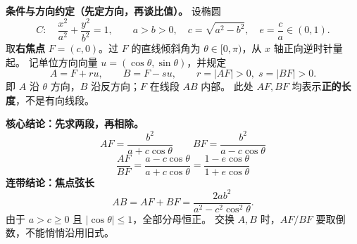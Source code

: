 \begin{statementbox}
\textbf{条件与方向约定（先定方向，再谈比值）。}
设椭圆
\[
 C:\quad \frac{x^2}{a^2}+\frac{y^2}{b^2}=1,\qquad
 a>b>0,\quad c=\sqrt{a^2-b^2},\quad e=\frac ca\in(0,1).
\]
取\textbf{右焦点} $F=(c,0)$。过 $F$ 的直线倾斜角为
$\theta\in[0,\pi)$，从 $x$ 轴正向逆时针量起。
记单位方向向量 $u=(\cos\theta,\sin\theta)$，并规定
\[
 A=F+ru,\qquad B=F-su,\qquad r=|AF|>0,\;s=|BF|>0.
\]
即 $A$ 沿 $\theta$ 方向，$B$ 沿反方向；$F$ 在线段 $AB$ 内部。
此处 $AF,BF$ 均表示\textbf{正的长度}，不是有向线段。
\par\smallskip\noindent
\textbf{核心结论：先求两段，再相除。}
\[
 \boxed{\displaystyle AF=\frac{b^2}{a+c\cos\theta}}
 \qquad
 \boxed{\displaystyle BF=\frac{b^2}{a-c\cos\theta}}
\]
\[
 \boxed{\displaystyle \frac{AF}{BF}
 =\frac{a-c\cos\theta}{a+c\cos\theta}
 =\frac{1-e\cos\theta}{1+e\cos\theta}}
\]
\textbf{连带结论：焦点弦长}
\[
 \boxed{\displaystyle AB=AF+BF
 =\frac{2ab^2}{a^2-c^2\cos^2\theta}}.
\]
由于 $a>c\ge 0$ 且 $|\cos\theta|\le1$，全部分母恒正。
交换 $A,B$ 时，$AF/BF$ 要取倒数，不能悄悄沿用旧式。
\end{statementbox}

